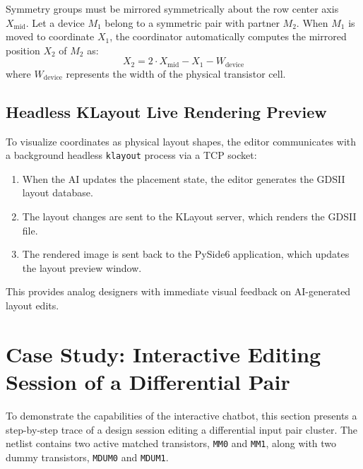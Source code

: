 Symmetry groups must be mirrored symmetrically about the row center axis $X_{\text{mid}}$. Let a device $M_1$ belong to a symmetric pair with partner $M_2$. When $M_1$ is moved to coordinate $X_1$, the coordinator automatically computes the mirrored position $X_2$ of $M_2$ as:
\begin{equation}
    X_2 = 2 \cdot X_{\text{mid}} - X_1 - W_{\text{device}}
\end{equation}
where $W_{\text{device}}$ represents the width of the physical transistor cell.

\subsection{Headless KLayout Live Rendering Preview}
To visualize coordinates as physical layout shapes, the editor communicates with a background headless \texttt{klayout} process via a TCP socket:
\begin{enumerate}
    \item When the AI updates the placement state, the editor generates the GDSII layout database.
    \item The layout changes are sent to the KLayout server, which renders the GDSII file.
    \item The rendered image is sent back to the PySide6 application, which updates the layout preview window.
\end{enumerate}
This provides analog designers with immediate visual feedback on AI-generated layout edits.

\section[Interactive Editing Case Study]{Case Study: Interactive Editing Session of a Differential Pair}
\label{sec:case_study}

To demonstrate the capabilities of the interactive chatbot, this section presents a step-by-step trace of a design session editing a differential input pair cluster. The netlist contains two active matched transistors, \texttt{MM0} and \texttt{MM1}, along with two dummy transistors, \texttt{MDUM0} and \texttt{MDUM1}.

